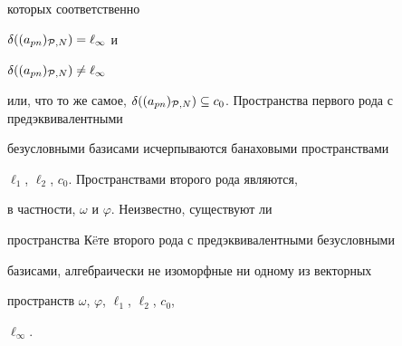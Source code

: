 которых соответственно


$\delta((a_{pn})_{{\cal P},N})=\ell_\infty$ и


$\delta((a_{pn})_{{\cal P},N})\ne\ell_\infty$


или, что то же самое, $\delta((a_{pn})_{{\cal


P},N})\subseteq c_0$. Пространства первого рода с предэквивалентными


безусловными базисами исчерпываются банаховыми пространствами


$\ell_1$, $\ell_2$, $c_0$. Пространствами второго рода являются,


в частности, $\omega$ и $\varphi$. Неизвестно, существуют ли


пространства К\"eте второго рода с предэквивалентными безусловными


базисами, алгебраически не изоморфные ни одному из векторных


пространств $\omega$, $\varphi$, $\ell_1$, $\ell_2$, $c_0$,


$\ell_\infty$.





